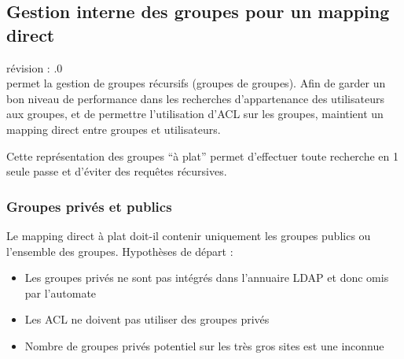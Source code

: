 

\subsection{Gestion interne des groupes pour un mapping direct}
\label{of_usergroup}
révision : .0\\

\obm permet la gestion de groupes récursifs (groupes de groupes). Afin de garder un bon niveau de performance dans les recherches d'appartenance des utilisateurs aux groupes, et de permettre l'utilisation d'ACL sur les groupes, \obm maintient un mapping direct entre groupes et utilisateurs.

Cette représentation des groupes ``à plat'' permet d'effectuer toute recherche en 1 seule passe et d'éviter des requêtes récursives.\\

\subsubsection{Groupes privés et publics}

Le mapping direct à plat doit-il contenir uniquement les groupes publics ou l'ensemble des groupes. Hypothèses de départ :\\
\begin{itemize}
\item Les groupes privés ne sont pas intégrés dans l'annuaire LDAP et donc omis par l'automate
\item Les ACL ne doivent pas utiliser des groupes privés
\item Nombre de groupes privés potentiel sur les très gros sites est une inconnue
\end{itemize}
\vspace{0.3cm}

\\

